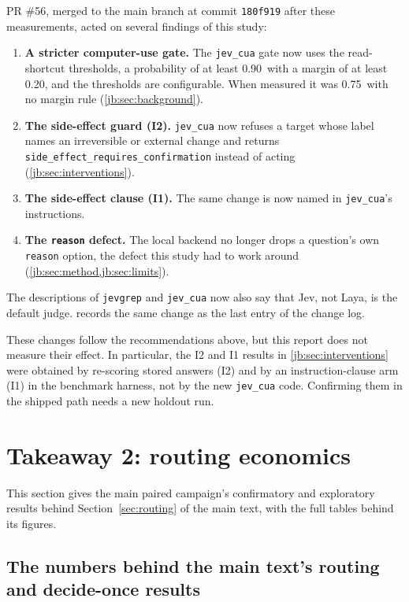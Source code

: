 \documentclass[11pt,letterpaper]{article}
\newcommand{\code}[1]{\texttt{#1}}
\newcommand{\CuaMinP}{0.75}
\newcommand{\MinMargin}{0.20}
\newcommand{\MinP}{0.90}
\newcommand{\SinceCommit}{180f919}
\newcommand{\SincePR}{56}
\newcommand{\mainpaper}{the main text}\newcommand{\thissupp}{these appendices}\newcommand{\Thissupp}{These appendices}
\begin{document}
PR \#\SincePR, merged to the main branch at commit \code{\SinceCommit} after these measurements, acted
on several findings of this study:
\begin{enumerate}[label=(\alph*)]
  \item \textbf{A stricter computer-use gate.} The \code{jev\_cua} gate now uses the read-shortcut
    thresholds, a probability of at least \MinP\ with a margin of at least \MinMargin, and the thresholds
    are configurable. When measured it was \CuaMinP\ with no margin rule (\cref{jb:sec:background}).
  \item \textbf{The side-effect guard (I2).} \code{jev\_cua} now refuses a target whose label names an
    irreversible or external change and returns \code{side\_effect\_requires\_confirmation} instead of
    acting (\cref{jb:sec:interventions}).
  \item \textbf{The side-effect clause (I1).} The same change is now named in \code{jev\_cua}'s
    instructions.
  \item \textbf{The \code{reason} defect.} The local backend no longer drops a question's own
    \code{reason} option, the defect this study had to work around (\cref{jb:sec:method,jb:sec:limits}).
\end{enumerate}
The descriptions of \code{jevgrep} and \code{jev\_cua} now also say that Jev, not Laya, is the default
judge.  records the same change as the last entry of the change log.

These changes follow the recommendations above, but this report does not measure their effect. In
particular, the I2 and I1 results in \cref{jb:sec:interventions} were obtained by re-scoring stored answers
(I2) and by an instruction-clause arm (I1) in the benchmark harness, not by the new \code{jev\_cua} code.
Confirming them in the shipped path needs a new holdout run.
\section{Takeaway 2: routing economics}\label{sec:c}

This section gives the main paired campaign's confirmatory and exploratory results behind
Section~\ref{sec:routing} of \mainpaper{}, with the full tables behind its figures.

\subsection{The numbers behind \mainpaper{}'s routing and decide-once results}\label{sec:ctrace}
\end{document}
